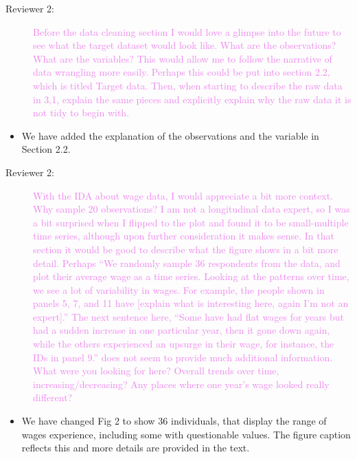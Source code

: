\documentclass[12pt,a4paper,]{article}
\providecommand{\tightlist}{%
  \setlength{\itemsep}{0pt}\setlength{\parskip}{0pt}}
\begin{document}
\begin{description}
\item[Reviewer 2:]\textcolor{violet}{Before the data cleaning section I would love a glimpse into the future to see what the target dataset would look like. What are the observations? What are the variables? This would allow me to follow the narrative of data wrangling more easily. Perhaps this could be put into section 2.2, which is titled Target data. Then, when starting to describe the raw data in 3,1, explain the same pieces and explicitly explain why the raw data it is not tidy to begin with.}
\end{description}

\begin{itemize}
\tightlist
\item
  We have added the explanation of the observations and the variable in Section 2.2.
\end{itemize}

\begin{description}
\item[Reviewer 2:]\textcolor{violet}{With the IDA about wage data, I would appreciate a bit more context. Why sample 20 observations? I am not a longitudinal data expert, so I was a bit surprised when I flipped to the plot and found it to be small-multiple time series, although upon further consideration it makes sense. In that section it would be good to describe what the figure shows in a bit more detail. Perhaps “We randomly sample 36 respondents from the data, and plot their average wage as a time series. Looking at the patterns over time, we see a lot of variability in wages. For example, the people shown in panels 5, 7, and 11 have [explain what is interesting here, again I’m not an expert].” The next sentence here, “Some have had flat wages for years but had a sudden increase in one particular year, then it gone down again, while the others experienced an upsurge in their wage, for instance, the IDs in panel 9.” does not seem to provide much additional information. What were you looking for here? Overall trends over time, increasing/decreasing? Any places where one year’s wage looked really different?}
\end{description}

\begin{itemize}
\tightlist
\item
  We have changed Fig 2 to show 36 individuals, that display the range of wages experience, including some with questionable values. The figure caption reflects this and more details are provided in the text.
\end{itemize}
\end{document}
